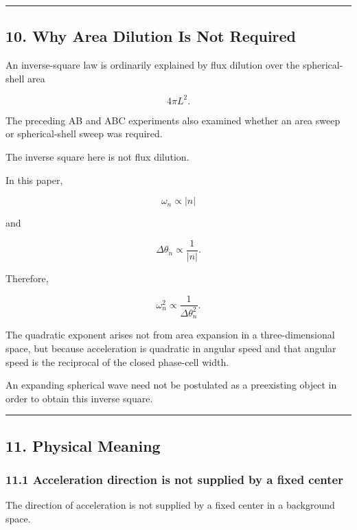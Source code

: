\documentclass[
  a4paper,
]{article}
\begin{document}
\begin{center}\rule{0.5\linewidth}{0.5pt}\end{center}

\subsection{10. Why Area Dilution Is Not
Required}\label{why-area-dilution-is-not-required}

An inverse-square law is ordinarily explained by flux dilution over the
spherical-shell area

\[
4\pi L^2.
\]

The preceding AB and ABC experiments also examined whether an area sweep
or spherical-shell sweep was required.

The inverse square here is not flux dilution.

In this paper,

\[
\omega_n\propto|n|
\]

and

\[
\Delta\theta_n\propto\frac{1}{|n|}.
\]

Therefore,

\[
\omega_n^2
\propto
\frac{1}{\Delta\theta_n^2}.
\]

The quadratic exponent arises not from area expansion in a
three-dimensional space, but because acceleration is quadratic in
angular speed and that angular speed is the reciprocal of the closed
phase-cell width.

An expanding spherical wave need not be postulated as a preexisting
object in order to obtain this inverse square.

\begin{center}\rule{0.5\linewidth}{0.5pt}\end{center}

\subsection{11. Physical Meaning}\label{physical-meaning}

\subsubsection{11.1 Acceleration direction is not supplied by a fixed
center}\label{acceleration-direction-is-not-supplied-by-a-fixed-center}

The direction of acceleration is not supplied by a fixed center in a
background space.
\end{document}
